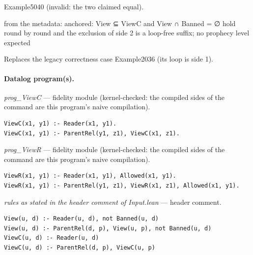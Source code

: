 \documentclass[10pt]{article}
\begin{document}
\begin{description}[leftmargin=2.6cm,style=nextline,itemsep=1pt]
\item[Twin] Example5040 (invalid: the two claimed equal).

\item[Obstruction note] from the metadata: anchored: View ⊆ ViewC and View ∩ Banned = ∅ hold round by round and the exclusion of side 2 is a loop-free suffix; no prophecy level expected

\item[Note] Replaces the legacy correctness case Example2036 (its loop is side 1).

\end{description}

\paragraph{Datalog program(s).}

{\raggedright\textit{prog\_ViewC} --- fidelity module (kernel-checked: the compiled sides of the command are this program's naive compilation).\par}

\begin{Verbatim}[fontsize=\scriptsize,breaklines=true,breakanywhere=true,frame=single,framesep=1.5mm]
ViewC(x1, y1) :- Reader(x1, y1).
ViewC(x1, y1) :- ParentRel(y1, z1), ViewC(x1, z1).
\end{Verbatim}

{\raggedright\textit{prog\_ViewR} --- fidelity module (kernel-checked: the compiled sides of the command are this program's naive compilation).\par}

\begin{Verbatim}[fontsize=\scriptsize,breaklines=true,breakanywhere=true,frame=single,framesep=1.5mm]
ViewR(x1, y1) :- Reader(x1, y1), Allowed(x1, y1).
ViewR(x1, y1) :- ParentRel(y1, z1), ViewR(x1, z1), Allowed(x1, y1).
\end{Verbatim}

{\raggedright\textit{rules as stated in the header comment of Input.lean} --- header comment.\par}

\begin{Verbatim}[fontsize=\scriptsize,breaklines=true,breakanywhere=true,frame=single,framesep=1.5mm]
View(u, d) :- Reader(u, d), not Banned(u, d)
View(u, d) :- ParentRel(d, p), View(u, p), not Banned(u, d)
ViewC(u, d) :- Reader(u, d)
ViewC(u, d) :- ParentRel(d, p), ViewC(u, p)
\end{Verbatim}
\end{document}
